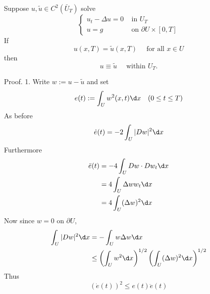 \begin{theorem}
    Suppose $u, \tilde{u} \in C^2\left(\bar{U}_T\right)$ solve
    \begin{equation*}
        \left\{\begin{aligned}
            u_t-\Delta u=0 & \text { in } U_T                     \\
            u=g            & \text { on } \partial U \times[0, T]
        \end{aligned}\right.
    \end{equation*}
    If
    \begin{equation*}
        u(x, T)=\tilde{u}(x, T) \quad \text{ for all } x \in U
    \end{equation*}
    then
    \begin{equation*}
        u \equiv \tilde{u} \quad \text { within } U_T .
    \end{equation*}

    Proof.
    1. Write $w:=u-\tilde{u}$ and set
    \begin{equation*}
        e(t):=\int_U w^2(x, t) \d x \quad(0 \leq t \leq T)
    \end{equation*}
    As before
    \begin{equation*}
        \dot{e}(t)=-2 \int_U|D w|^2 \d x
    \end{equation*}
    Furthermore
    \begin{equation*}
        \begin{aligned}
            \ddot{e}(t) & =-4 \int_U D w \cdot D w_t \d x \\
                        & =4 \int_U \Delta w w_t \d x     \\
                        & =4 \int_U(\Delta w)^2 \d x
        \end{aligned}
    \end{equation*}
    Now since $w=0$ on $\partial U$,
    \begin{equation*}
        \begin{aligned}
            \int_U|D w|^2 \d x & =-\int_U w \Delta w \d x                                                             \\
                               & \leq\left(\int_U w^2 \d x\right)^{1 / 2}\left(\int_U(\Delta w)^2 \d x\right)^{1 / 2}
        \end{aligned}
    \end{equation*}
    Thus
    \begin{equation*}
        (\dot{e}(t))^2 \leq e(t) \ddot{e}(t)
    \end{equation*}


\end{theorem}
